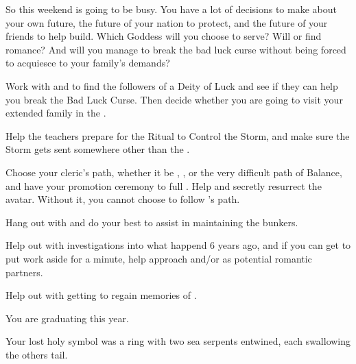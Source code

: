\documentclass[char]{GL2020}
\begin{document}
So this weekend is going to be busy. You have a lot of decisions to make about your own future, the future of your nation to protect, and the future of your friends to help build. Which Goddess will you choose to serve? Will \cPresident{} or \cChupAvenger{} find romance? And will you manage to break the bad luck curse without being forced to acquiesce to your \pFarm{} family's demands?

\begin{itemz}
	\item Work with \cPresident{} and \cWarlordDaughter{} to find the followers of a Deity of Luck and see if they can help you break the Bad Luck Curse. Then decide whether you are going to visit your extended family in the \pFarm{}.
	\item Help the teachers prepare for the Ritual to Control the Storm, and make sure the Storm gets sent somewhere other than the \pShip{}.
	\item Choose your cleric's path, whether it be \cEbbFull{\full}, \cFlowFull{\full}, or the very difficult path of Balance, and have your promotion ceremony to full \cInitiate{\cleric}. Help \cFlowPriest{} and \cEbbPriest{} secretly resurrect the \cEbb{} avatar. Without it, you cannot choose to follow \cEbb{}'s path.
	\item Hang out with \cBunker{} and do your best to assist \cBunker{\them} in maintaining the bunkers.
	\item Help \cPresident{} out with \cPresident{\their} investigations into what happend 6 years ago, and if you can get \cPresident{\them} to put work aside for a minute, help \cPresident{\them} approach \cHeir{} and/or \cChupStudent{} as potential romantic partners.
	\item Help \cChupAvenger{} out with getting \cHeadScientist{} to regain \cHeadScientist{\their} memories of \cChupAvenger{}.
\end{itemz}

\begin{itemz}[Notes]
	\item You are graduating this year.
	\item Your lost holy symbol was a ring with two sea serpents entwined, each swallowing the others tail.
\end{itemz}
\end{document}
